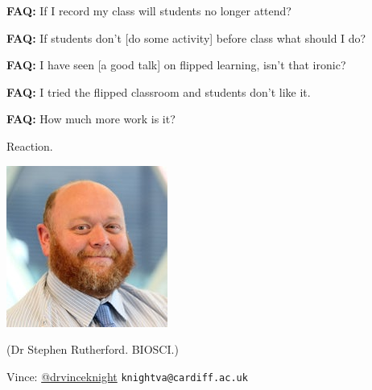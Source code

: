 \documentclass{beamer}
\begin{document}
    \begin{frame}
        \begin{center}
			\Large
            \textbf{FAQ:} If I record my class will students no longer attend?
        \end{center}
    \end{frame}

	\begin{frame}
		\begin{center}
			\Large
			\textbf{FAQ:} If students don't [do some activity] before class what
            should I do?
		\end{center}
	\end{frame}

    \begin{frame}
        \begin{center}
			\Large
            \textbf{FAQ:} I have seen [a good talk] on flipped learning, isn't
            that ironic?
        \end{center}
    \end{frame}

	\begin{frame}
		\begin{center}
			\Large
			\textbf{FAQ:} I tried the flipped classroom and students don't like it.
		\end{center}
	\end{frame}

	\begin{frame}
		\begin{center}
			\Large
			\textbf{FAQ:} How much more work is it?
		\end{center}
	\end{frame}

    \begin{frame}
        \begin{center}
            \Large
            Reaction.
        \end{center}
    \end{frame}

    \begin{frame}
        \begin{center}
            \includegraphics[width=.5\textwidth]{./static/Rutherford_Stephen_staff_profile.jpg}

            (Dr Stephen Rutherford. BIOSCI.)
        \end{center}
    \end{frame}

    \begin{frame}
        \begin{center}
            \normalsize
            Vince: \href{https://twitter.com/drvinceknight}{@drvinceknight}
            \texttt{knightva@cardiff.ac.uk}
        \end{center}
    \end{frame}
\end{document}
